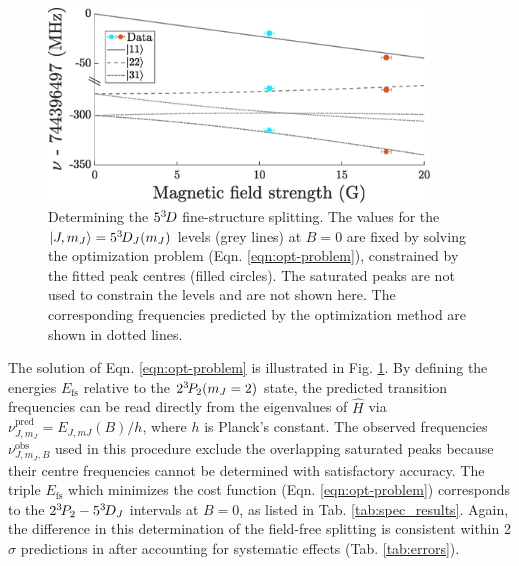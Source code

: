 	\begin{figure}
	\centering
		\includegraphics[width=0.9\textwidth]{fig/spectroscopy/fitting-lines}
		\caption{Determining the $5^{3\!} D$ fine-structure splitting.
		The values for the $|J,m_J\rangle=5^{3\!} D_J(m_J)$ levels (grey lines) at $B=0$ are fixed by solving the optimization problem (Eqn.
		\ref{eqn:opt-problem}), constrained by the fitted peak centres (filled circles).
		The saturated peaks are not used to constrain the levels and are not shown here. \com{}
		The corresponding frequencies predicted by the optimization method are shown in dotted lines.}
	    \label{fig:fitting_3D}
	\end{figure}

	The solution of Eqn.
	\ref{eqn:opt-problem} is illustrated in Fig.
	\ref{fig:fitting_3D}.
	By defining the energies $E_{\textrm{fs}}$ relative to the $2^{3\!} P_2(m_J=2)$ state,  the predicted transition frequencies can be read directly from the eigenvalues of $\hat{H}$ via $\nu_{J,m_J}^{\textrm{pred}}=E_{J,mJ}(B)/h$, where $h$ is Planck's constant.
	The observed frequencies $\nu_{J,m_J,B}^{\textrm{obs}}$ used in this procedure exclude the overlapping saturated peaks because their centre frequencies cannot be determined with satisfactory accuracy.
	The triple $E_{\textrm{fs}}$ which minimizes the cost function (Eqn.
	\ref{eqn:opt-problem}) corresponds to the $2^{3\!} P_2 - 5^{3\!} D_J$ intervals at $B=0$, as listed in Tab.
	\ref{tab:spec_results}.
	Again, the difference in this determination of the field-free splitting is consistent within 2$\sigma$ predictions in \cite{Drake07} after accounting for systematic effects (Tab.
	\ref{tab:errors}).
	






